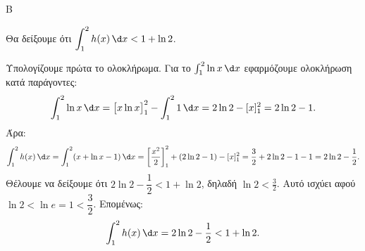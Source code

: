\begin{thema}{Β}
\begin{erwthma}
\item Θα δείξουμε ότι $\displaystyle\int_1^2 h(x)\,\d x < 1 + \ln 2$.

Υπολογίζουμε πρώτα το ολοκλήρωμα. Για το $\int_1^2 \ln x\,\d x$ εφαρμόζουμε ολοκλήρωση κατά παράγοντες:
\[
\int_1^2 \ln x\,\d x = \bigl[x\ln x\bigr]_1^2 - \int_1^2 1\,\d x = 2\ln 2 - [x]_1^2 = 2\ln2 - 1.
\]
Άρα:
\[
\int_1^2 h(x)\,\d x = \int_1^2 (x + \ln x - 1)\,\d x = \left[\frac{x^2}{2}\right]_1^2 + (2\ln2 - 1) - [x]_1^2
= \frac{3}{2} + 2\ln2 - 1 - 1 = 2\ln2 - \frac{1}{2}.
\]
Θέλουμε να δείξουμε ότι $2\ln 2 - \dfrac{1}{2} < 1 + \ln 2$, δηλαδή $\ln 2 < \frac{3}{2}$. Αυτό ισχύει αφού $\ln 2 < \ln e = 1 < \dfrac{3}{2}$.
Επομένως:
\[
\int_1^2 h(x)\,\d x = 2\ln2 - \frac{1}{2} < 1 + \ln2.
\]

\end{erwthma}
\end{thema}

